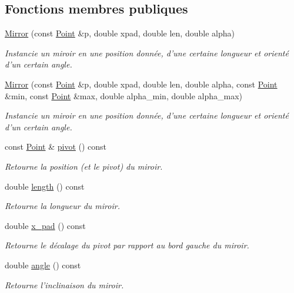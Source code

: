 \subsection*{Fonctions membres publiques}
\begin{DoxyCompactItemize}
\item 
\hyperlink{classMirror_a3f32fd1e7fb4f1a3dbad8aba00d1267b}{Mirror} (const \hyperlink{classPoint}{Point} \&p, double xpad, double len, double alpha)
\begin{DoxyCompactList}\small\item\em Instancie un miroir en une position donnée, d'une certaine longueur et orienté d'un certain angle. \end{DoxyCompactList}\item 
\hyperlink{classMirror_a675db929cb6f6555163dbc2a089fe026}{Mirror} (const \hyperlink{classPoint}{Point} \&p, double xpad, double len, double alpha, const \hyperlink{classPoint}{Point} \&min, const \hyperlink{classPoint}{Point} \&max, double alpha\+\_\+min, double alpha\+\_\+max)
\begin{DoxyCompactList}\small\item\em Instancie un miroir en une position donnée, d'une certaine longueur et orienté d'un certain angle. \end{DoxyCompactList}\item 
const \hyperlink{classPoint}{Point} \& \hyperlink{classMirror_ad68e2946b5267e738663ffdf4b8841f5}{pivot} () const 
\begin{DoxyCompactList}\small\item\em Retourne la position (et le pivot) du miroir. \end{DoxyCompactList}\item 
double \hyperlink{classMirror_a9fae8ef086cb8598d689f29c68379106}{length} () const 
\begin{DoxyCompactList}\small\item\em Retourne la longueur du miroir. \end{DoxyCompactList}\item 
double \hyperlink{classMirror_aa3ec313ce158d894e084065c2eaa8cb8}{x\+\_\+pad} () const 
\begin{DoxyCompactList}\small\item\em Retourne le décalage du pivot par rapport au bord gauche du miroir. \end{DoxyCompactList}\item 
double \hyperlink{classMirror_a70b7d41a7df7213da8f8c4ac4c873739}{angle} () const 
\begin{DoxyCompactList}\small\item\em Retourne l'inclinaison du miroir. \end{DoxyCompactList}\item 

\end{DoxyCompactItemize}
